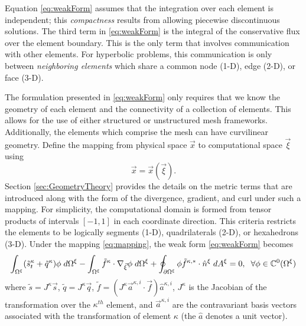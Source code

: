 \documentclass[12pt]{softwaremanual}
\begin{document}
Equation \eqref{eq:weakForm} assumes that the integration over each element is independent; this \textit{compactness} results from allowing piecewise discontinuous solutions. The third term in \eqref{eq:weakForm} is the integral of the conservative flux over the element boundary. This is the only term that involves communication with other elements. For hyperbolic problems, this communication is only between \textit{neighboring elements} which share a common node (1-D), edge (2-D), or face (3-D).

  The formulation presented in \eqref{eq:weakForm} only requires that we know the geometry of each element and the connectivity of a collection of elements. This allows for the use of either structured or unstructured mesh frameworks. Additionally, the elements which comprise the mesh can have curvilinear geometry. Define the mapping from physical space $\vec{x}$ to computational space $\vec{\xi}$ using
  \begin{equation}
  \vec{x} = \vec{x}(\vec{\xi}).\label{eq:mapping}
  \end{equation}
  Section \ref{sec:GeometryTheory} provides the details on the metric terms that are introduced along with the form of the divergence, gradient, and curl under such a mapping. For simplicity, the computational domain is formed from tensor products of intervals $[-1, 1]$ in each coordinate direction. This criteria restricts the elements to be logically segments (1-D), quadrilaterals (2-D), or hexahedrons (3-D). Under the mapping \eqref{eq:mapping}, the weak form \eqref{eq:weakForm} becomes
  \begin{equation}
  \int_{\Omega^\xi} (\tilde{s}^\kappa_t + \tilde{q}^\kappa) \phi \hspace{1mm} d\Omega^\xi  - \int_{\Omega^\xi} \tilde{f}^\kappa \cdot \nabla_{\vec{\xi}} \phi  \hspace{1mm} d\Omega^\xi + \oint_{\partial \Omega^\xi} \phi \tilde{f}^{\kappa,*}  \cdot \hat{n}^\xi \hspace{1mm} d A^\xi = 0, \hspace{2mm} \forall \phi \in \mathbb{C}^0(\Omega^\xi) \label{eq:mappedWeakForm}
  \end{equation}
  where $\tilde{s} = J^\kappa\vec{s}$, $\tilde{q} = J^\kappa\vec{q}$, $\tilde{f} = ( J^\kappa \vec{a}^{\kappa,i} \cdot \vec{f} ) \hat{a}^{\kappa,i}$, $J^{\kappa}$ is the Jacobian of the transformation over the $\kappa^{th}$ element, and $\vec{a}^{\kappa,i}$ are the contravariant basis vectors associated with the transformation of element $\kappa$ (the $\hat{a}$ denotes a unit vector).\\
  
\end{document}
